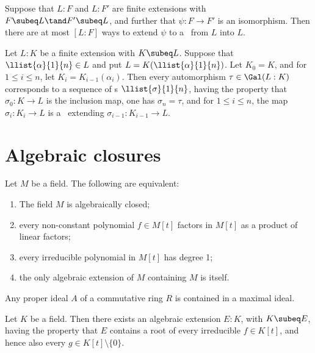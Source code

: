 \documentclass{article}
\begin{document}
  \begin{tcorollary}
    Suppose that \( L:F \) and \( L:F' \) are finite extensions with \( F\subeq L\tand F'\subeq L \), and further that \( \psi:F\to F' \) is an isomorphism. Then there are at most \( [L:F] \) ways to extend \( \psi \) to a \homo~from \( L \) into \( L \).
  \end{tcorollary}

  \begin{tcorollary}
    Let \( L:K \) be a finite extension with \( K\subeq L \). Suppose that \( \llist{\alpha}{1}{n}\in L \) and put \( L=K(\llist{\alpha}{1}{n}) \). Let \( K_0=K \), and for \( 1\leq i\leq n \), let \( K_i=K_{i-1}(\alpha_i) \). Then every automorphism \( \tau\in\Gal(L:K) \) corresponds to a sequence of \homo s \( \llist{\sigma}{1}{n} \), having the property that \( \sigma_0:K\to L \) is the inclusion map, one has \( \sigma_n=\tau \), and for \( 1\leq i\leq n \), the map \( \sigma_i:K_i\to L \) is a \homo~extending \( \sigma_{i-1}:K_{i-1}\to L \).
  \end{tcorollary}

\section{Algebraic closures}
  \begin{lemma}
    Let \( M \) be a field. The following are equivalent:
    \begin{enumerate}[label=(\roman*)]
      \item The field \( M \) is algebraically closed;
      \item every non-constant polynomial \( f\in M[t] \) factors in \( M[t] \) as a product of linear factors;
      \item every irreducible polynomial in \( M[t] \) has degree 1;
      \item the only algebraic extension of \( M \) containing \( M \) is itself.
    \end{enumerate}
  \end{lemma}

  \begin{tproposition}
    Any proper ideal \( A \) of a commutative ring \( R \) is contained in a maximal ideal.
  \end{tproposition}

  \begin{lemma}
    Let \( K \) be a field. Then there exists an algebraic extension \( E:K \), with \( K\subeq E \), having the property that \( E \) contains a root of every irreducible \( f\in K[t] \), and hence also every \( g\in K[t]\setminus\{ 0 \} \).
  \end{lemma}
\end{document}
